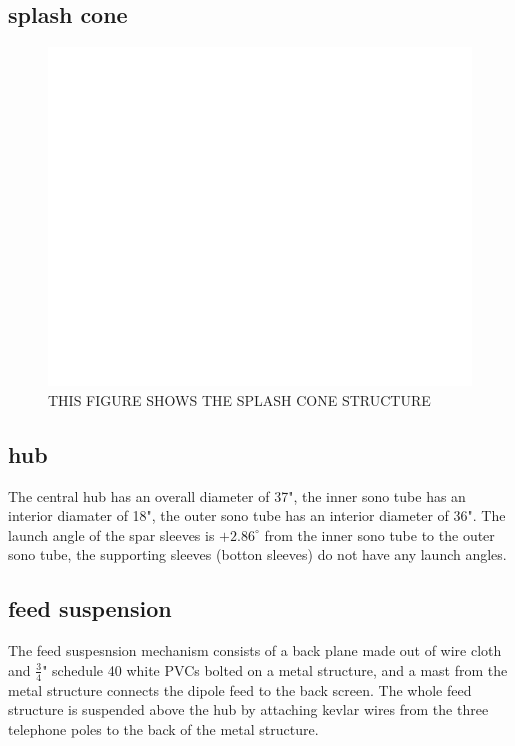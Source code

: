 \documentclass[preprint]{aastex}  %
\begin{document}
\subsection{splash cone}
\begin{figure}[H]
	\begin{center}
	\includegraphics[width =\textwidth]{empty}
	\caption{THIS FIGURE SHOWS THE SPLASH CONE STRUCTURE
\label{Fig:} }
	\end{center}
\end{figure}

\subsection{hub}
The central hub has an overall diameter of 37", the inner sono tube has an interior diamater of 18", the outer sono tube has an interior diameter of 36". The launch angle of the spar sleeves is $+2.86^{\circ}$ from the inner sono tube to the outer sono tube, the supporting sleeves (botton sleeves) do not have any launch angles.


\subsection {feed suspension}
The feed suspesnsion mechanism consists of a back plane made out of wire cloth and $\frac{3}{4}$" schedule 40 white PVCs bolted on a metal structure, and a mast from the metal structure connects the dipole feed to the back screen. The whole feed structure is suspended above the hub by attaching kevlar wires from the three telephone poles to the back of the metal structure. 
\end{document}
